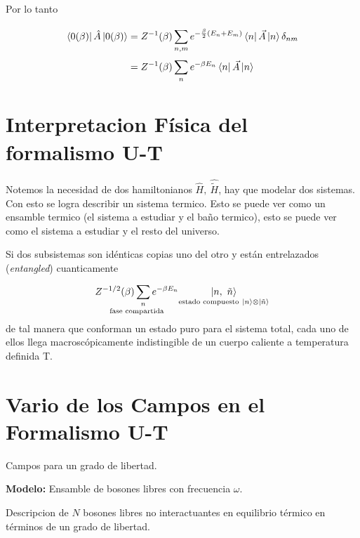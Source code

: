 \documentclass{article}
\begin{document}
Por lo tanto 

\begin{align*}
  \bra{0(\beta)}\hat A \ket{0(\beta)} &= Z ^ {-1 }(\beta) \displaystyle\sum_{n,m }^{} e ^ {- \frac{\beta}{2}(E_n+E_m )} \bra{n }\vec A \ket{n }\delta _{nm }    \\
    &=Z ^ {-1 }(\beta) \displaystyle\sum_{n }^{} e ^ {- \beta E_n} \bra{n }\vec A \ket{n }
\end{align*}

\section{Interpretacion Física del formalismo U-T }
Notemos la necesidad de dos hamiltonianos $ \hat H , \ \hat{\tilde H } $, hay que modelar dos sistemas. Con esto se logra describir un sistema termico.  Esto se puede ver como un ensamble termico (el sistema a estudiar y el baño termico), esto se puede ver como el sistema a estudiar y el resto del universo.


Si dos subsistemas son idénticas copias uno del otro y están entrelazados (\textit{entangled}) cuanticamente 
\begin{gather*}
  \underset{\text{fase compartida}}{Z ^ {-1/2 }(\beta) \displaystyle\sum_{n }^{} e ^ {- \beta E_n}} \underset{\text{estado compuesto}\ \ket{n }\otimes \ket{\tilde n}}{\ket{n,\ \tilde n }}
\end{gather*}
de tal manera que conforman un estado puro para el sistema total, cada uno de ellos llega macroscópicamente indistingible de un cuerpo caliente a temperatura definida T.

\section{Vario de los Campos en el Formalismo U-T }
Campos para un grado de libertad. 

\textbf{Modelo: } Ensamble de bosones libres con frecuencia $ \omega $.

\hfill 

\hfill 

Descripcion de $ N  $ bosones libres no interactuantes en equilibrio térmico en términos de un grado de libertad.
\end{document}
